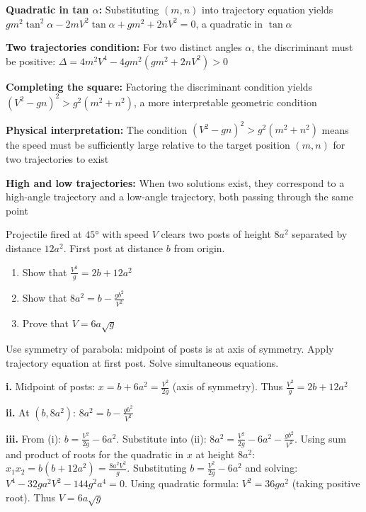\begin{takeaways}
\item \textbf{Quadratic in tan $\alpha$:} Substituting $(m,n)$ into trajectory equation yields $gm^2\tan^2\alpha - 2mV^2\tan\alpha + gm^2 + 2nV^2 = 0$, a quadratic in $\tan\alpha$
\item \textbf{Two trajectories condition:} For two distinct angles $\alpha$, the discriminant must be positive: $\Delta = 4m^2V^4 - 4gm^2(gm^2+2nV^2) > 0$
\item \textbf{Completing the square:} Factoring the discriminant condition yields $(V^2-gn)^2 > g^2(m^2+n^2)$, a more interpretable geometric condition
\item \textbf{Physical interpretation:} The condition $(V^2-gn)^2 > g^2(m^2+n^2)$ means the speed must be sufficiently large relative to the target position $(m,n)$ for two trajectories to exist
\item \textbf{High and low trajectories:} When two solutions exist, they correspond to a high-angle trajectory and a low-angle trajectory, both passing through the same point
\end{takeaways}

\begin{problem}[Symmetry at 45°]
Projectile fired at $45°$ with speed $V$ clears two posts of height $8a^2$ separated by distance $12a^2$. First post at distance $b$ from origin.

\begin{enumerate}[label=\textbf{\roman*.}]
    \item Show that $\frac{V^2}{g} = 2b + 12a^2$
    \item Show that $8a^2 = b - \frac{gb^2}{V^2}$
    \item Prove that $V = 6a\sqrt{g}$
\end{enumerate}
\end{problem}

\begin{hint}
Use symmetry of parabola: midpoint of posts is at axis of symmetry. Apply trajectory equation at first post. Solve simultaneous equations.
\end{hint}

\begin{solution}
\textbf{i.} Midpoint of posts: $x = b + 6a^2 = \frac{V^2}{2g}$ (axis of symmetry). Thus $\frac{V^2}{g} = 2b + 12a^2$ 

\textbf{ii.} At $(b, 8a^2)$: $8a^2 = b - \frac{gb^2}{V^2}$ 

\textbf{iii.} From (i): $b = \frac{V^2}{2g} - 6a^2$. Substitute into (ii): $8a^2 = \frac{V^2}{2g} - 6a^2 - \frac{gb^2}{V^2}$. Using sum and product of roots for the quadratic in $x$ at height $8a^2$: $x_1 x_2 = b(b+12a^2) = \frac{8a^2V^2}{g}$. Substituting $b = \frac{V^2}{2g} - 6a^2$ and solving: $V^4 - 32ga^2V^2 - 144g^2a^4 = 0$. Using quadratic formula: $V^2 = 36ga^2$ (taking positive root). Thus $V = 6a\sqrt{g}$ 
\end{solution}

